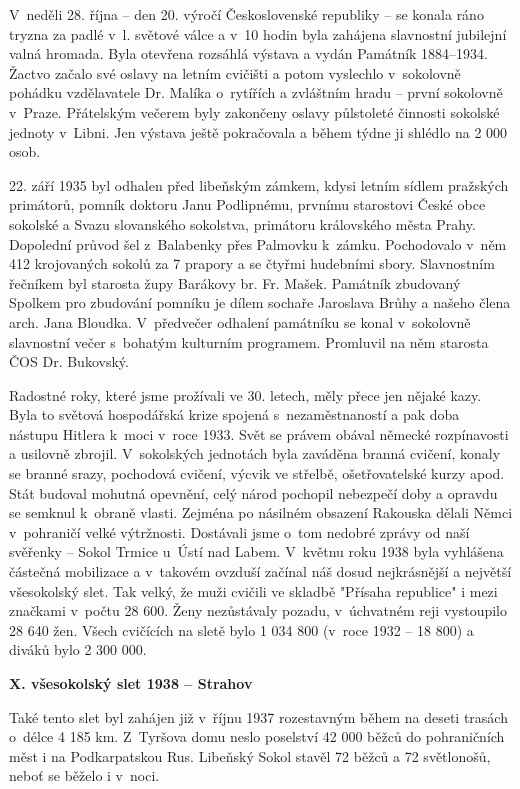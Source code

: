 \documentclass[a5paper, 11pt, twoside]{article}
\begin{document}
V~neděli 28. října -- den 20. výročí Československé republiky -- se
konala ráno tryzna za padlé v~l. světové válce a v~10 hodin byla
zahájena slavnostní jubilejní valná hromada. Byla otevřena rozsáhlá
výstava a vydán Památník 1884--1934. Žactvo začalo své oslavy
na letním cvičišti a potom vyslechlo v~sokolovně pohádku vzdělavatele
Dr. Malíka o~rytířích a zvláštním hradu -- první sokolovně v~Praze.
Přátelským večerem byly zakončeny oslavy půlstoleté činnosti sokolské
jednoty v~Libni. Jen výstava ještě pokračovala a během týdne ji shlédlo
na 2 000 osob.

22. září 1935 byl odhalen před libeňským zámkem, kdysi letním sídlem
pražských primátorů, pomník doktoru Janu Podlipnému, prvnímu starostovi
České obce sokolské a Svazu slovanského sokolstva, primátoru královského
města Prahy. Dopolední průvod šel z~Balabenky přes Palmovku k~zámku.
Pochodovalo v~něm 412 krojovaných sokolů za 7 prapory a se čtyřmi
hudebními sbory. Slavnostním řečníkem byl starosta župy Barákovy br. Fr.
Mašek. Památník zbudovaný Spolkem pro zbudování pomníku je dílem sochaře
Jaroslava Brůhy a našeho člena arch. Jana Bloudka. V~předvečer odhalení
památníku se konal v~sokolovně slavnostní večer s~bohatým kulturním
programem. Promluvil na něm starosta ČOS Dr. Bukovský.

Radostné roky, které jsme prožívali ve 30. letech, měly přece jen nějaké
kazy. Byla to světová hospodářská krize spojená s~nezaměstnaností a pak
doba nástupu Hitlera k~moci v~roce 1933. Svět se právem obával německé
rozpínavosti a usilovně zbrojil. V~sokolských jednotách byla zaváděna
branná cvičení, konaly se branné srazy, pochodová cvičení, výcvik ve
střelbě, ošetřovatelské kurzy apod. Stát budoval mohutná opevnění, celý
národ pochopil nebezpečí doby a opravdu se semknul k~obraně vlasti.
Zejména po násilném obsazení Rakouska dělali Němci v~pohraničí velké
výtržnosti. Dostávali jsme o~tom nedobré zprávy od naší svěřenky --
Sokol Trmice u~Ústí nad Labem. V~květnu roku 1938 byla vyhlášena
částečná mobilizace a v~takovém ovzduší začínal náš dosud nejkrásnější a
největší všesokolský slet. Tak velký, že muži cvičili ve skladbě
"Přísaha republice" i mezi značkami v~počtu 28 600. Ženy nezůstávaly
pozadu, v~úchvatném reji vystoupilo 28 640 žen. Všech cvičících na sletě
bylo 1 034 800 (v~roce 1932 -- 18 800) a diváků bylo 2 300 000.

\textbf{X. všesokolský slet 1938 -- Strahov}

Také tento slet byl zahájen již v~říjnu 1937 rozestavným během na deseti
trasách o~délce 4 185 km. Z~Tyršova domu neslo poselství 42 000 běžců do
pohraničních měst i na Podkarpatskou Rus. Libeňský Sokol stavěl 72 běžců
a 72 světlonošů, neboť se běželo i v~noci.
\end{document}
